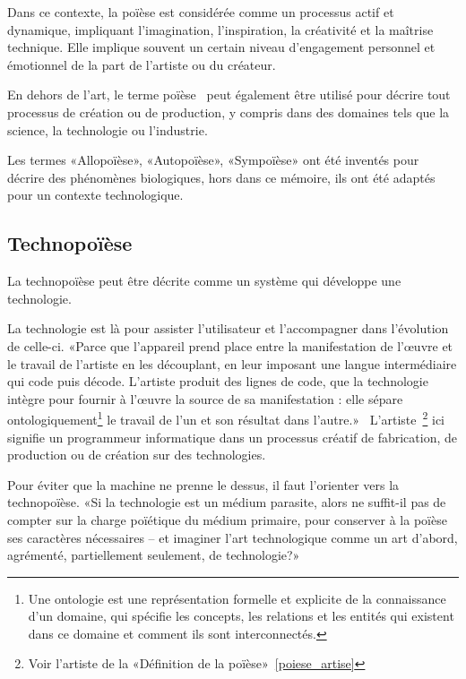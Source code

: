 Dans ce contexte, la poïèse est considérée comme un processus actif et dynamique, impliquant l'imagination, l'inspiration, la créativité et la maîtrise technique. Elle implique souvent un certain niveau d'engagement personnel et émotionnel de la part de l'artiste\label{poiese_artise} ou du créateur.

En dehors de l'art, le terme poïèse~\cite{wikipedia_poiese_2022} peut également être utilisé pour décrire tout processus de création ou de production, y compris dans des domaines tels que la science, la technologie ou l'industrie.

Les termes «Allopoïèse», «Autopoïèse», «Sympoïèse» ont été inventés pour décrire des phénomènes biologiques, hors dans ce mémoire, ils ont été adaptés pour un contexte technologique.

\subsection{Technopoïèse}

La technopoïèse peut être décrite comme un système qui développe une technologie.

La technologie est là pour assister l'utilisateur et l'accompagner dans l'évolution de celle-ci. «Parce que l’appareil prend place entre la manifestation de l’œuvre et le travail de l’artiste en les découplant, en leur imposant une langue intermédiaire qui code puis décode. L’artiste produit des lignes de code, que la technologie intègre pour fournir à l’œuvre la source de sa manifestation : elle sépare ontologiquement\footnote{Une ontologie est une représentation formelle et explicite de la connaissance d'un domaine, qui spécifie les concepts, les relations et les entités qui existent dans ce domaine et comment ils sont interconnectés.} le travail de l’un et son résultat dans l’autre.»~\cite{artiste_techno_conf_2012} L'artiste~\footnote{Voir l'artiste de la «Définition de la poïèse»~\ref{poiese_artise}} ici signifie un programmeur informatique dans un processus créatif de fabrication, de production ou de création sur des technologies.

Pour éviter que la machine ne prenne le dessus, il faut l'orienter vers la technopoïèse. «Si la technologie est un médium parasite, alors ne suffit-il pas de compter sur la charge poïétique du médium primaire, pour conserver à la poïèse ses caractères nécessaires – et imaginer l’art technologique comme un art d’abord, agrémenté, partiellement seulement, de technologie?»~\cite{artiste_techno_conf_2012}

